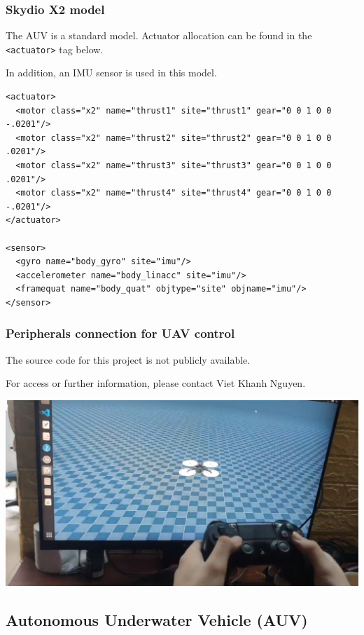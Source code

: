 \documentclass[9pt]{beamer}
\begin{document}
			\begin{frame}[fragile]
				\frametitle{Skydio X2 model}
				The AUV is a standard model. Actuator allocation can be found in the \texttt{<actuator>} tag below.
				
				In addition, an IMU sensor is used in this model.
					\begin{verbatim}
<actuator>
  <motor class="x2" name="thrust1" site="thrust1" gear="0 0 1 0 0 -.0201"/>
  <motor class="x2" name="thrust2" site="thrust2" gear="0 0 1 0 0  .0201"/>
  <motor class="x2" name="thrust3" site="thrust3" gear="0 0 1 0 0  .0201"/>
  <motor class="x2" name="thrust4" site="thrust4" gear="0 0 1 0 0 -.0201"/>
</actuator>

<sensor>
  <gyro name="body_gyro" site="imu"/>
  <accelerometer name="body_linacc" site="imu"/>
  <framequat name="body_quat" objtype="site" objname="imu"/>
</sensor>
				\end{verbatim}
			\end{frame}
		
			\begin{frame}[fragile]
				\frametitle{Peripherals connection for UAV control}
				The source code for this project is not publicly available.
				
				For access or further information, please contact Viet Khanh Nguyen.
				\begin{center}
					\includegraphics[width=1\linewidth]{images/mjc-uav}
				\end{center}
			\end{frame}
		
		
		
		
		
		\subsection{Autonomous Underwater Vehicle (AUV)}
		
\end{document}

